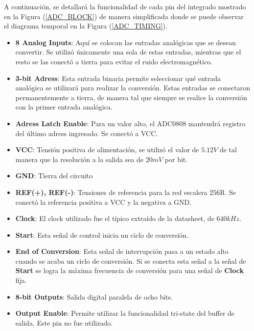 A continuación, se detallará la funcionalidad de cada pin del integrado mostrado en la Figura (\ref{ADC_BLOCK}) de manera simplificada donde se puede observar el diagrama temporal en la Figura (\ref{ADC_TIMING}).

\begin{itemize}
\item \textbf{8 Analog Inputs}: Aquí se colocan las entradas analógicas que se desean convertir. Se utilizó únicamente una sola de estas entradas, mientras que el resto se las conectó a tierra para evitar el ruido electromagnético.
\item \textbf{3-bit Adress}: Esta entrada binaria permite seleccionar qué entrada analógica se utilizará para realizar la conversión. Estas entradas se conectaron permanentemente a tierra, de manera tal que siempre se realice la conversión con la primer entrada analógica.
\item \textbf{Adress Latch Enable}: Para un valor alto, el ADC0808 mantendrá registro del último adress ingresado. Se conectó a VCC.
\item \textbf{VCC}: Tensión positiva de alimentación, se utilizó el valor de $5.12V$ de tal manera que la resolución a la salida sea de $20mV$ por bit.
\item \textbf{GND}: Tierra del circuito
\item \textbf{REF(+), REF(-)}: Tensiones de referencia para la red escalera 256R. Se conectó la referencia positiva a VCC y la negativa a GND.
\item \textbf{Clock}: El clock utilizado fue el típico extraído de la datasheet, de $640kHz$.
\item \textbf{Start}: Esta señal de control inicia un ciclo de conversión.
\item \textbf{End of Conversion}: Esta señal de interrupción pasa a un estado alto cuando se acaba un ciclo de conversión. Si se conecta esta señal a la señal de \textbf{Start} se logra la máxima frecuencia de conversión para una señal de \textbf{Clock} fija.
\item \textbf{8-bit Outputs}: Salida digital paralela de ocho bits.
\item \textbf{Output Enable}: Permite utilizar la funcionalidad tri-state del buffer de salida. Este pin no fue utilizado.
\end{itemize}

